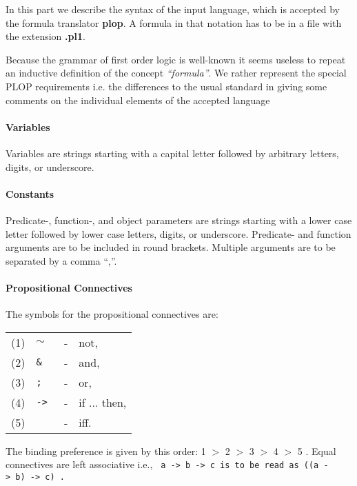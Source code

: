 
In this part we describe the syntax of the input language, which is
accepted by the formula translator {\bf plop}.
A formula in that notation has to be in a file with the extension {\bf .pl1}.

Because the grammar of first order logic is well-known it seems
useless to repeat an inductive definition of the concept 
{\em ``formula''}. We rather represent the special PLOP
requirements i.e. the differences to the usual
standard in giving some comments on the individual
elements of the accepted language

\paragraph{Variables}
Variables are strings starting with a capital letter followed 
by arbitrary letters, digits, or underscore.

\paragraph{Constants}
Predicate-, function-, and object parameters are strings starting 
with a lower case letter followed by lower case letters, digits, or underscore. 
Predicate- and function arguments are to be included in round brackets.
Multiple arguments are to be separated by a comma ``,''.

\paragraph{Propositional Connectives}
The symbols for the propositional connectives are:

\begin{center}
\begin{tabular}{llll}
(1) &  {\tt $\sim$}  &   - &  not, \\
(2)  &	 {\tt \& } & -  & and, \\
(3)   &{\tt ; } & -  & or, \\
(4)   &{\tt -> } & -  & if ... then, \\
(5) & 	 {\tt <->}  & -  & iff. 
\end{tabular}                  
\end{center}

The binding preference is given by this order:
1 $>$ 2 $>$ 3 $>$ 4 $>$ 5 . 
Equal connectives are left associative i.e.,
\tt 
\mbox{a -> b -> c} \rm is to be read as \tt \mbox{((a -> b) -> c)} 
\rm .

